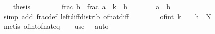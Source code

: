 \begin{isabellebody}
\ \ \isamarkupfalse%
\ {\isacharquery}{\kern0pt}thesis\isanewline
\ \ \isamarkupfalse%
\isanewline
\ \ \ \ \isamarkupfalse%
\ {\isachardoublequoteopen}frac\ {\isacharparenleft}{\kern0pt}b{\isacharasterisk}{\kern0pt}{\isasymtheta}{\isacharparenright}{\kern0pt}\ {\isacharminus}{\kern0pt}\ frac\ {\isacharparenleft}{\kern0pt}a{\isacharasterisk}{\kern0pt}{\isasymtheta}{\isacharparenright}{\kern0pt}\ {\isacharequal}{\kern0pt}\ {\isacharquery}{\kern0pt}k{\isacharasterisk}{\kern0pt}{\isasymtheta}\ {\isacharminus}{\kern0pt}\ {\isacharquery}{\kern0pt}h{\isachardoublequoteclose}\isanewline
\ \ \ \ \ \ \isamarkupfalse%
\ {\isacartoucheopen}a\ {\isacharless}{\kern0pt}\ b{\isacartoucheclose}\ \isamarkupfalse%
\ {\isacharparenleft}{\kern0pt}simp\ add{\isacharcolon}{\kern0pt}\ frac{\isacharunderscore}{\kern0pt}def\ left{\isacharunderscore}{\kern0pt}diff{\isacharunderscore}{\kern0pt}distrib\ of{\isacharunderscore}{\kern0pt}nat{\isacharunderscore}{\kern0pt}diff{\isacharparenright}{\kern0pt}\isanewline
\ \ \ \ \isamarkupfalse%
\ {\isacharasterisk}{\kern0pt}\ \isamarkupfalse%
\ {\isachardoublequoteopen}{\isasymbar}of{\isacharunderscore}{\kern0pt}int\ {\isacharquery}{\kern0pt}k\ {\isacharasterisk}{\kern0pt}\ {\isasymtheta}\ {\isacharminus}{\kern0pt}\ {\isacharquery}{\kern0pt}h{\isasymbar}\ {\isacharless}{\kern0pt}\ {}{\isacharslash}{\kern0pt}N{\isachardoublequoteclose}\isanewline
\ \ \ \ \ \ \isamarkupfalse%
\ {\isacharparenleft}{\kern0pt}metis\ of{\isacharunderscore}{\kern0pt}int{\isacharunderscore}{\kern0pt}of{\isacharunderscore}{\kern0pt}nat{\isacharunderscore}{\kern0pt}eq{\isacharparenright}{\kern0pt}\isanewline
\ \ \isamarkupfalse%
\ {\isacharparenleft}{\kern0pt}use\ {\isacharasterisk}{\kern0pt}\ \ auto{\isacharparenright}{\kern0pt}\isanewline
{}\isamarkupfalse%
%
\endisatagproof
{\isafoldproof}%
%
\isadelimproof
\isanewline
%
\endisadelimproof
%
\isadelimtheory
\isanewline
%
\endisadelimtheory
%
\isatagtheory
{}\isamarkupfalse%
%
\endisatagtheory
{\isafoldtheory}%
%
\isadelimtheory
%
\endisadelimtheory
%
\end{isabellebody}%
\endinput
